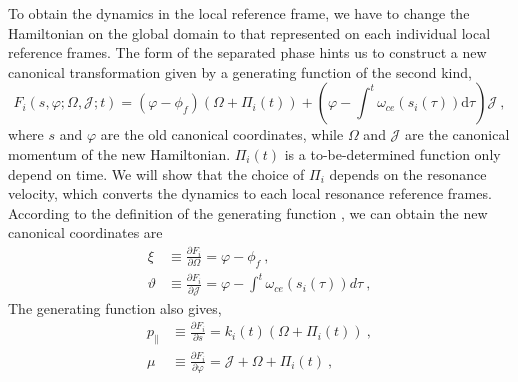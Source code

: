 To obtain the dynamics in the local reference frame, we have to change the Hamiltonian on the global domain to that represented on each individual local reference frames.
The form of the separated phase hints us to construct a new canonical transformation given by a generating function of the second kind,
\begin{equation}\label{eq.gf2}
        F_{i}(s, \varphi ; \Omega, \mathcal{J};t) = \left(\varphi - \phi_f \right) \left(\Omega+\Pi_{i}(t)\right) +\left(\varphi-\int^{t} \omega_{ce}\left(s_{i}(\tau)\right)\mathrm{d}\tau\right)\mathcal{J}~,
\end{equation}
where $s$ and $\varphi$ are the old canonical coordinates, while $\Omega$ and $\mathcal{J}$ are the canonical momentum of the new Hamiltonian. 
$\Pi_i(t)$ is a to-be-determined function only depend on time.
We will show that the choice of $\Pi_i$ depends on the resonance velocity, which converts the dynamics to each local resonance reference frames.
According to the definition of the generating function \cite{goldstein2001}, we can obtain the new canonical coordinates are 
\begin{equation}\label{eq.newQ}
    \begin{aligned}
         \xi & \equiv \frac{\partial F_i}{\partial \Omega} =  \varphi - \phi_f~,
         \\ 
        \vartheta & \equiv   \frac{\partial F_i}{\partial \mathcal{J}} = \varphi -\int^{t} \omega_{c e}\left(s_{i}(\tau)\right) d \tau ~,
    \end{aligned}
\end{equation}
The generating function also gives,
\begin{equation}
    \begin{aligned}
        p_\| & \equiv \frac{\partial F_i}{\partial s} = k_{i}(t)( \Omega+\Pi_{i}(t))~,
        \\
        \mu & \equiv \frac{\partial F_i}{\partial \varphi} = \mathcal{J} +\Omega+\Pi_{i}(t)~,
    \end{aligned}
\end{equation}
